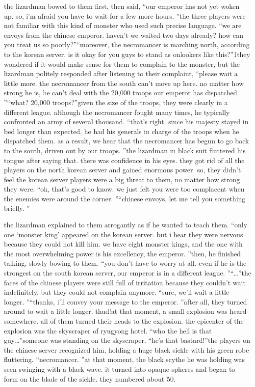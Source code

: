 the lizardman bowed to them first, then said, “our emperor has not yet woken up.
 so, i’m afraid you have to wait for a few more hours.
”the three players were not familiar with this kind of monster who used such precise language.
“we are envoys from the chinese emperor.
 haven’t we waited two days already? how can you treat us so poorly?”“moreover, the necromancer is marching north, according to the korean server.
 is it okay for you guys to stand as onlookers like this?”1they wondered if it would make sense for them to complain to the monster, but the lizardman politely responded after listening to their complaint, “please wait a little more.
 the necromancer from the south can’t move up here.
 no matter how strong he is, he can’t deal with the 20,000 troops our emperor has dispatched.
”“what? 20,000 troops?”given the size of the troops, they were clearly in a different league.
 although the necromancer fought many times, he typically confronted an army of several thousand.
“that’s right.
 since his majesty stayed in bed longer than expected, he had his generals in charge of the troops when he dispatched them.
 as a result, we hear that the necromancer has begun to go back to the south, driven out by our troops.
”the lizardman in black suit fluttered his tongue after saying that.
 there was confidence in his eyes.
 they got rid of all the players on the north korean server and gained enormous power.
so, they didn’t feel the korean server players were a big threat to them, no matter how strong they were.
“oh, that’s good to know.
 we just felt you were too complacent when the enemies were around the corner.
”“chinese envoys, let me tell you something briefly.
”

the lizardman explained to them arrogantly as if he wanted to teach them.
“only one ‘monster king’ appeared on the korean server.
 but i hear they were nervous because they could not kill him.
 we have eight monster kings, and the one with the most overwhelming power is his excellency, the emperor.
”then, he finished talking, slowly bowing to them.
“you don’t have to worry at all.
 even if he is the strongest on the south korean server, our emperor is in a different league.
”“…”the faces of the chinese players were still full of irritation because they couldn’t wait indefinitely, but they could not complain anymore.
“sure, we’ll wait a little longer.
”“thanks, i’ll convey your message to the emperor.
”after all, they turned around to wait a little longer.
thud!at that moment, a small explosion was heard somewhere.
 all of them turned their heads to the explosion.
 the epicenter of the explosion was the skyscraper of ryugyong hotel.
“who the hell is that guy…”someone was standing on the skyscraper.
“he’s that bastard!”the players on the chinese server recognized him, holding a huge black sickle with his green robe fluttering.
“necromancer.
”at that moment, the black scythe he was holding was seen swinging with a black wave.
it turned into opaque spheres and began to form on the blade of the sickle.
 they numbered about 50.


 